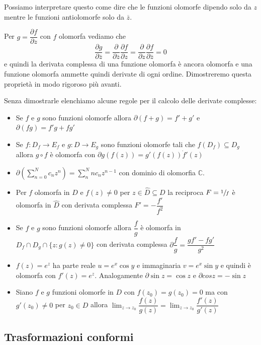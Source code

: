 \documentclass[11pt,a4paper,twoside]{book}
\newenvironment{osservazione}[1][Osservazione]{ 
  \begin{center}\begin{tcolorbox}[
  title={#1:~},
  width=0.9\linewidth,
  flush right,
  enhanced jigsaw, 
  colback=white, 
  frame hidden, 
  sharpish corners, arc=3mm,
  borderline west = {1pt}{0pt}{gray},
  borderline south = {1pt}{0pt}{gray},
  coltitle=black, 
  fonttitle=\small\bfseries, 
  attach title to upper, 
  breakable,
  top=2.5pt, bottom=0.3pt]\small
  }{
 \normalsize \end{tcolorbox}\end{center}
}
\theoremstyle{esss}
\theoremstyle{dotless}
\numberwithin{equation}{section} %
\begin{document}
Possiamo interpretare questo come dire che le funzioni olomorfe dipendo solo da $z$ mentre le funzioni antiolomorfe solo da $\overline{z}$.

\begin{osservazione}Per $g=\dfrac{\partial f}{\partial z}$ con $f$ olomorfa vediamo che \[\dfrac{\partial g}{\partial \overline{z}}=\dfrac{\partial }{\partial \overline{z}}\dfrac{\partial f}{\partial z}=\dfrac{\partial }{\partial z}\dfrac{\partial f}{\partial \overline{z}}=0\] e quindi la derivata complessa di una funzione olomorfa è ancora olomorfa e una funzione olomorfa ammette quindi derivate di ogni ordine. Dimostreremo questa proprietà in modo rigoroso più avanti.
\end{osservazione}

Senza dimostrarle elenchiamo alcune regole per il calcolo delle derivate complesse:\begin{itemize}[label=$\cdot$]
\item Se $f$ e $g$ sono funzioni olomorfe allora $\partial(f+g)=f'+g'$ e $\partial (fg)=f'g+fg'$
\item Se $f:D_f\rightarrow E_f$ e $g:D\rightarrow E_g$ sono funzioni olomorfe tali che $f(D_f)\subseteq D_g$ allora $g\circ f$ è olomorfa con $\partial g(f(z))=g'(f(z))\dot f'(z)$
\item $\partial\left( \sum_{n=0}^N c_n z^n\right)  = \sum_n^N nc_n z^{n-1}$ con dominio di olomorfia $\mathbb{C}$.
\item Per $f$ olomorfa in $D$ e $f(z)\neq 0$ per $z\in\hat{D}\subseteq D$ la reciproca $F=\sfrac{1}{f}$ è olomorfa in $\hat{D}$ con derivata complessa $F'=-\dfrac{f'}{f^2}$
\item Se $f$ e $g$ sono funzioni olomorfe allora $\dfrac{f}{g}$ è olomorfa in $D_f\cap D_g\cap\{z:g(z)\neq0\}$ con derivata complessa $\partial \dfrac{f}{g}=\dfrac{gf'-fg'}{g^2}$
\item $f(z)=e^z$ ha parte reale $u=e^x\cos{y}$ e immaginaria $v=e^x\sin{y}$ e quindi è olomorfa con $f'(z)=e^z$. Analogamente $\partial \sin{z}=\cos{z}$ e $\partial cos{z}=-\sin{z}$
\item Siano $f$ e $g$ funzioni olomorfe in $D$ con $f(z_0)=g(z_0)=0$ ma con $g'(z_0)\neq0$ per $z_0\in D$ allora $\lim_{z\rightarrow z_0} \dfrac{f(z)}{g(z)}=\lim_{z\rightarrow z_0} \dfrac{f'(z)}{g'(z)}$
\end{itemize}

\subsection{Trasformazioni conformi}
\end{document}
